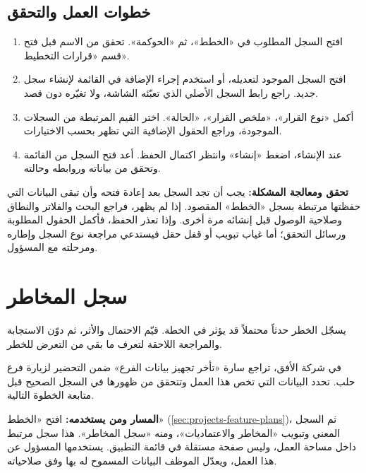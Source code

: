 \subsection{خطوات العمل والتحقق}
\begin{enumerate}
\item افتح السجل المطلوب في «الخطط»، ثم «الحوكمة». تحقق من الاسم قبل فتح قسم «قرارات التخطيط».
\item افتح السجل الموجود لتعديله، أو استخدم إجراء الإضافة في القائمة لإنشاء سجل جديد. راجع رابط السجل الأصلي الذي تعبّئه الشاشة، ولا تغيّره دون قصد.
\item أكمل «نوع القرار»، «ملخص القرار»، «الحالة». اختر القيم المرتبطة من السجلات الموجودة، وراجع الحقول الإضافية التي تظهر بحسب الاختيارات.
\item عند الإنشاء، اضغط «إنشاء» وانتظر اكتمال الحفظ. أعد فتح السجل من القائمة وتحقق من بياناته وروابطه وحالته.
\end{enumerate}

\textbf{تحقق ومعالجة المشكلة:} يجب أن تجد السجل بعد إعادة فتحه وأن تبقى البيانات التي حفظتها مرتبطة بسجل «الخطط» المقصود. إذا لم يظهر، فراجع البحث والفلاتر والنطاق وصلاحية الوصول قبل إنشائه مرة أخرى. وإذا تعذر الحفظ، فأكمل الحقول المطلوبة ورسائل التحقق؛ أما غياب تبويب أو قفل حقل فيستدعي مراجعة نوع السجل وإطاره ومرحلته مع المسؤول.

\clearpage
\section{سجل المخاطر}
\label{sec:projects-feature-planning-risks}

يسجّل الخطر حدثاً محتملاً قد يؤثر في الخطة. قيّم الاحتمال والأثر، ثم دوّن الاستجابة والمراجعة اللاحقة لتعرف ما بقي من التعرض للخطر.

\begin{rcnote}
في شركة الأفق، تراجع سارة «تأخر تجهيز بيانات الفرع» ضمن التحضير لزيارة فرع حلب. تحدد البيانات التي تخص هذا العمل وتتحقق من ظهورها في السجل الصحيح قبل متابعة الخطوة التالية.
\end{rcnote}

\textbf{المسار ومن يستخدمه:} افتح «الخطط» (\ref{sec:projects-feature-plans})، ثم السجل المعني وتبويب «المخاطر والاعتماديات»، ومنه «سجل المخاطر». هذا سجل مرتبط داخل مساحة العمل، وليس صفحة مستقلة في قائمة التطبيق. يستخدمها المسؤول عن هذا العمل، ويعدّل الموظف البيانات المسموح له بها وفق صلاحياته.

